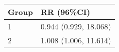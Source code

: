 \begin{tabular}{ll}
  \hline
Group & RR (96\%CI) \\ 
  \hline
   1 & 0.944 (0.929, 18.068) \\ 
     2 & 1.008 (1.006, 11.614) \\ 
   \hline
\end{tabular}

